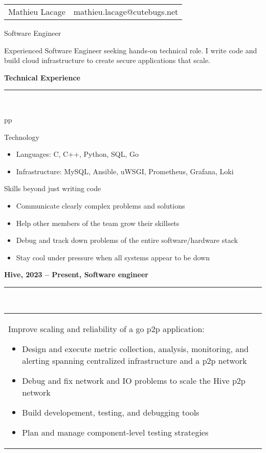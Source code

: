 \documentclass[a4paper,12pt]{article}
\newcommand{\ligne}[1]{\rule[0.5ex]{\textwidth}{#1}\\}
\newcommand{\styleRub}[1]{\textbf{\large #1}\par}
\newcommand{\indentStd}{\noindent\hspace*{10pt}}
\newenvironment{rubrique}[2][\linewidth]%
{\styleRub{#2}%
\ligne{0.5mm}
\setlength{\lenB}{#1}%
\setlength{\lenC}{\linewidth}%
\addtolength{\lenC}{-\lenA}%
\addtolength{\lenC}{-\lenB}%
\addtolength{\lenC}{-19pt}
\indentStd\begin{tabular}[t]{p{\lenB}p{\lenC}}}
{\end{tabular}}
\newlength{\lenA} %
\newlength{\lenB} %
\newlength{\lenC} %
\begin{document}
\begin{tabular*}{1\textwidth}{@{\extracolsep{\fill}}lr}
Mathieu Lacage & mathieu.lacage@cutebugs.net\\
\end{tabular*}

\vspace{1cm}
\begin{center}{\huge Software Engineer}\end{center}

\begin{center}
Experienced Software Engineer seeking hands-on technical role.\newline
        I write code and build cloud infrastructure to create
secure applications that scale.
\end{center}

\vspace{1cm}
\begin{rubrique}{Technical Experience}

Technology
\begin{itemize}
\item Languages: C, C++, Python, SQL, Go
\item Infrastructure: MySQL, Ansible, uWSGI, Prometheus, Grafana, Loki
\end{itemize}

Skills beyond just writing code
\begin{itemize}
\item Communicate clearly complex problems and solutions
\item Help other members of the team grow their skillsets
\item Debug and track down problems of the entire software/hardware stack
\item Stay cool under pressure when all systems appear to be down
\end{itemize}

\end{rubrique}

\vspace{0.5cm}
\begin{rubrique}{Hive, 2023 -- Present, Software engineer}

Improve scaling and reliability of a go p2p application:
\begin{itemize}
\item Design and execute metric collection, analysis, monitoring, and alerting
        spanning centralized infrastructure and a p2p network
\item Debug and fix network and IO problems to scale the Hive p2p network
\item Build developement, testing, and debugging tools
\item Plan and manage component-level testing strategies
\end{itemize}

\end{rubrique}
\pagebreak
\end{document}

